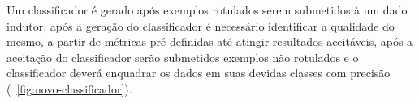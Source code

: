Um classificador é gerado após exemplos rotulados serem submetidos à um dado indutor, após a geração do classificador 
é necessário identificar a qualidade do mesmo, a partir de métricas pré-definidas até atingir resultados aceitáveis, após a aceitação do classificador 
serão submetidos exemplos não rotulados e o classificador deverá enquadrar os dados em suas devidas classes com precisão (~\autoref{fig:novo-classificador}). 
\begin{figure}[htb!]
	\centering
\end{figure}  

